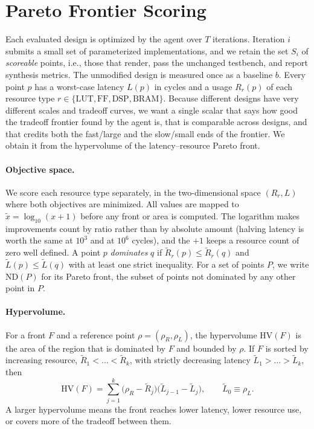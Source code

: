 \section{Pareto Frontier Scoring}
\label{sec:pareto-scoring}

Each evaluated design is optimized by the agent over $T$ iterations. Iteration
$i$ submits a small set of parameterized implementations, and we retain the set
$S_i$ of \emph{scoreable} points, i.e., those that render, pass the unchanged
testbench, and report synthesis metrics. The unmodified design is measured once
as a baseline $b$. Every point $p$ has a worst-case latency $L(p)$ in cycles and
a usage $R_r(p)$ of each resource type $r \in \{\text{LUT}, \text{FF}, \text{DSP},
\text{BRAM}\}$. Because different designs have very different scales and
tradeoff curves, we want a single scalar that says how good the tradeoff
frontier found by the agent is, that is comparable across designs, and that
credits both the fast/large and the slow/small ends of the frontier.
We obtain it from the hypervolume of the latency--resource Pareto front.

\paragraph{Objective space.}
We score each resource type separately, in the two-dimensional space
$(R_r, L)$ where both objectives are minimized. All values are mapped to
$\tilde{x} = \log_{10}(x + 1)$ before any front or area is computed. The
logarithm makes improvements count by ratio rather than by absolute amount
(halving latency is worth the same at $10^3$ and at $10^6$ cycles), and the
$+1$ keeps a resource count of zero well defined. A point $p$ \emph{dominates}
$q$ if $\tilde{R}_r(p) \le \tilde{R}_r(q)$ and $\tilde{L}(p) \le \tilde{L}(q)$
with at least one strict inequality. For a set of points $P$, we write
$\mathrm{ND}(P)$ for its Pareto front, the subset of points not dominated by
any other point in $P$.

\paragraph{Hypervolume.}
For a front $F$ and a reference point $\rho = (\rho_R, \rho_L)$, the
hypervolume $\mathrm{HV}(F)$ is the area of the region that is dominated by $F$
and bounded by $\rho$. If $F$ is sorted by increasing resource,
$\tilde{R}_1 < \dots < \tilde{R}_k$, with strictly decreasing latency
$\tilde{L}_1 > \dots > \tilde{L}_k$, then
\begin{equation}
  \mathrm{HV}(F) = \sum_{j=1}^{k} \bigl(\rho_R - \tilde{R}_j\bigr)
  \bigl(\tilde{L}_{j-1} - \tilde{L}_j\bigr), \qquad \tilde{L}_0 \equiv \rho_L .
\end{equation}
A larger hypervolume means the front reaches lower latency, lower resource use,
or covers more of the tradeoff between them.

